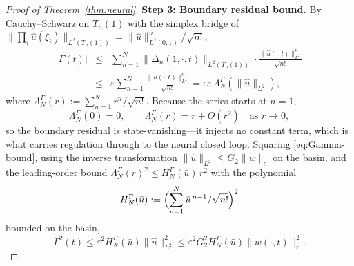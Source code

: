 \documentclass[journal,twoside,web]{ieeecolor}
\begin{document}
\begin{proof}[Proof of Theorem~\ref{thm:neural}]
\medskip\noindent\textbf{Step 3: Boundary residual bound.}
By Cauchy--Schwarz on $T_n(1)$ with the simplex bridge of \cite{HV2} $\|\prod_i\hat u(\xi_i)\|_{L^2(T_n(1))}=\|\hat u\|^n_{L^2(0,1)}/\sqrt{n!}$,
\begin{eqnarray}
|\Gamma(t)| &\le& \sum_{n=1}^N\|\Delta_n(1,\cdot,t)\|_{L^2(T_n(1))}\cdot\frac{\|\hat u(\cdot,t)\|^n_{L^2}}{\sqrt{n!}} \nonumber\\
&\le& \varepsilon\sum_{n=1}^N\frac{\|\hat u(\cdot,t)\|^n_{L^2}}{\sqrt{n!}}=:\varepsilon\,\Lambda^\Gamma_N(\|\hat u\|_{L^2}), \label{eq:Gamma-bound}
\end{eqnarray}
where $\Lambda^\Gamma_N(r):=\sum_{n=1}^N r^n/\sqrt{n!}$. Because the series starts at $n=1$,
\begin{equation}\label{eq:Gamma-vanishing}
\Lambda^\Gamma_N(0)=0,\qquad \Lambda^\Gamma_N(r)=r+O(r^2)\quad\text{as }r\to 0,
\end{equation}
so the boundary residual is state-vanishing---it injects no constant term, which is what carries regulation through to the neural closed loop. Squaring \eqref{eq:Gamma-bound}, using the inverse transformation $\|\hat u\|_{L^2}\le G_2\|w\|_c$ on the basin, and the leading-order bound $\Lambda^\Gamma_N(r)^2\le H^\Gamma_N(\bar u)\,r^2$ with the polynomial
\begin{equation}\label{eq:HGamma-def}
H^\Gamma_N(\bar u):=\Bigl(\sum_{n=1}^N \bar u^{\,n-1}/\sqrt{n!}\Bigr)^2
\end{equation}
bounded on the basin,
\begin{equation}\label{eq:Gamma-sq-bound}
\Gamma^2(t)\le \varepsilon^2 H^\Gamma_N(\bar u)\|\hat u\|^2_{L^2}\le \varepsilon^2 G_2^2 H^\Gamma_N(\bar u)\|w(\cdot,t)\|_c^2.
\end{equation}


\end{proof}
\end{document}
